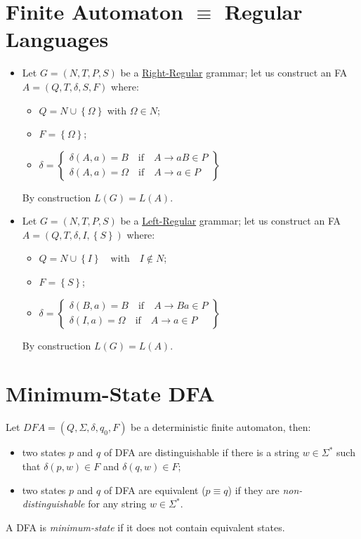 \section{Finite Automaton $\equiv$ Regular Languages}
\begin{itemize}
    \item Let $G = (N, T, P, S)$ be a \underline{Right-Regular} grammar; let us construct an FA $A = (Q, T, \delta, S, F)$ where:
    \begin{itemize}
        \item $Q = N \cup \left\{\Omega\right\}$ with $\Omega \in N$;
        \item $F = \left\{\Omega\right\}$;
        \item $
            \delta = \begin{Bmatrix}
                \delta(A, a) = B \quad \text{if} \quad A \to aB \in P \\
                \delta(A, a) = \Omega \quad \text{if} \quad A \to a \in P
            \end{Bmatrix}
        $
    \end{itemize}
    By construction $L(G) = L(A)$.
    \item Let $G = (N, T, P, S)$ be a \underline{Left-Regular} grammar; let us construct an FA $A = (Q, T, \delta, I, \left\{S\right\})$ where:
    \begin{itemize}
        \item $Q = N \cup \left\{I\right\} \quad \text{with} \quad I \notin N$;
        \item $F = \left\{S\right\}$;
        \item $
            \delta = \begin{Bmatrix}
                \delta(B, a) = B \quad \text{if} \quad A \to Ba \in P \\
                \delta(I, a) = \Omega \quad \text{if} \quad A \to a \in P
            \end{Bmatrix}
        $
    \end{itemize}
    By construction $L(G) = L(A)$.
\end{itemize}

\section{Minimum-State DFA}
Let $DFA = (Q, \Sigma, \delta, q_0, F)$ be a deterministic finite automaton, then:
\begin{itemize}
    \item two states $p$ and $q$ of DFA are distinguishable if there is a string $w \in \Sigma^\ast$ such that $\delta(p, w) \in F$ and $\delta(q, w) \in F$;
    \item two states $p$ and $q$ of DFA are equivalent ($p \equiv q$) if they are \emph{non-distinguishable} for any string $w \in \Sigma^\ast$.
\end{itemize}
A DFA is \emph{minimum-state} if it does not contain equivalent states.

